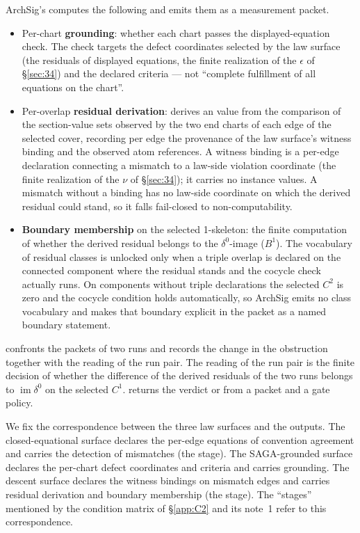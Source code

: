 ArchSig's  computes the following and emits them as a
measurement packet.
\begin{itemize}
\item Per-chart \textbf{grounding}: whether each chart passes the
displayed-equation check. The check targets the defect coordinates
selected by the law surface (the residuals of displayed equations, the
finite realization of the $\epsilon$ of \S\ref{sec:34}) and the
declared criteria --- not ``complete fulfillment of all equations on
the chart''.
\item Per-overlap \textbf{residual derivation}: derives an 
value from the comparison of the section-value sets observed by the
two end charts of each edge of the selected cover, recording per edge
the provenance of the law surface's witness binding and the observed
atom references. A witness binding is a per-edge declaration
connecting a mismatch to a law-side violation coordinate (the finite
realization of the $\nu$ of \S\ref{sec:34}); it carries no instance
values. A mismatch without a binding has no law-side coordinate on
which the derived residual could stand, so it falls fail-closed to
non-computability.
\item \textbf{Boundary membership} on the selected 1-skeleton: the
finite  computation of whether the derived residual belongs
to the $\delta^0$-image ($B^1$). The vocabulary of residual classes is
unlocked only when a triple overlap is declared on the connected
component where the residual stands and the cocycle check actually
runs. On components without triple declarations the selected $C^2$ is
zero and the cocycle condition holds automatically, so ArchSig emits
no class vocabulary and makes that boundary explicit in the packet as
a named boundary statement.
\end{itemize}

 confronts the packets of two runs and records the
change in the obstruction together with the reading of the run pair.
The reading of the run pair is the finite  decision of
whether the difference of the derived residuals of the two runs
belongs to $\operatorname{im}\delta^0$ on the selected $C^1$.
 returns the verdict  or
 from a packet and a gate policy.

We fix the correspondence between the three law surfaces and the
outputs. The closed-equational surface declares the per-edge equations
of convention agreement and carries the detection of mismatches (the
 stage). The SAGA-grounded surface declares the per-chart defect
coordinates and criteria and carries grounding. The descent surface
declares the witness bindings on mismatch edges and carries residual
derivation and boundary membership (the  stage). The
``stages'' mentioned by the condition matrix of \S\ref{app:C2} and its
note~1 refer to this correspondence.

